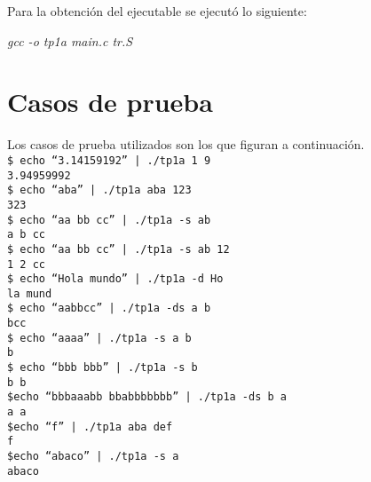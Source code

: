 \documentclass[a4paper,10pt]{article}
\begin{document}
Para la obtenci\'{o}n del ejecutable se ejecut\'{o} lo siguiente:

\textit{gcc -o tp1a main.c tr.S}

\section{Casos de prueba}
Los casos de prueba utilizados son los que figuran a continuaci\'{o}n.\\

\indent\texttt{\$ echo ``3.14159192'' | ./tp1a 1 9}\\
\indent\texttt{3.94959992}\\

\indent\texttt{\$ echo ``aba'' | ./tp1a aba 123}\\
\indent\texttt{323}\\

\indent\texttt{\$ echo ``aa bb cc'' | ./tp1a -s ab}\\
\indent\texttt{a b cc}\\

\indent\texttt{\$ echo ``aa bb cc'' | ./tp1a -s ab 12}\\
\indent\texttt{1 2 cc}\\

\indent\texttt{\$ echo ``Hola mundo'' | ./tp1a -d Ho}\\
\indent\texttt{la mund}\\

\indent\texttt{\$ echo ``aabbcc'' | ./tp1a -ds a b}\\
\indent\texttt{bcc}\\

\indent\texttt{\$ echo ``aaaa'' | ./tp1a -s a b}\\
\indent\texttt{b}\\

\indent\texttt{\$ echo ``bbb bbb'' | ./tp1a -s b}\\
\indent\texttt{b b}\\

\indent\texttt{\$echo ``bbbaaabb bbabbbbbbb'' | ./tp1a -ds b a}\\
\indent\texttt{a a}\\

\indent\texttt{\$echo ``f'' | ./tp1a aba def}\\
\indent\texttt{f}\\

\indent\texttt{\$echo ``abaco'' | ./tp1a -s a}\\
\indent\texttt{abaco}\\
\end{document}
